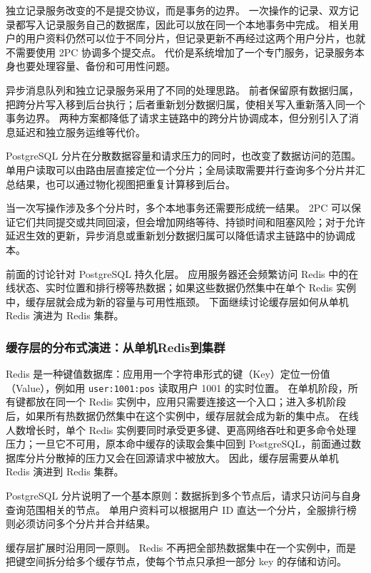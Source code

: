 独立记录服务改变的不是提交协议，而是事务的边界。
一次操作的记录、双方记录都写入记录服务自己的数据库，因此可以放在同一个本地事务中完成。
相关用户的用户资料仍然可以位于不同分片，但记录更新不再经过这两个用户分片，也就不需要使用 2PC 协调多个提交点。
代价是系统增加了一个专门服务，记录服务本身也要处理容量、备份和可用性问题。

异步消息队列和独立记录服务采用了不同的处理思路。
前者保留原有数据归属，把跨分片写入移到后台执行；后者重新划分数据归属，使相关写入重新落入同一个事务边界。
两种方案都降低了请求主链路中的跨分片协调成本，但分别引入了消息延迟和独立服务运维等代价。

PostgreSQL 分片在分散数据容量和请求压力的同时，也改变了数据访问的范围。
单用户读取可以由路由层直接定位一个分片；全局读取需要并行查询多个分片并汇总结果，也可以通过物化视图把重复计算移到后台。

当一次写操作涉及多个分片时，多个本地事务还需要形成统一结果。
2PC 可以保证它们共同提交或共同回滚，但会增加网络等待、持锁时间和阻塞风险；对于允许延迟生效的更新，异步消息或重新划分数据归属可以降低请求主链路中的协调成本。

前面的讨论针对 PostgreSQL 持久化层。
应用服务器还会频繁访问 Redis 中的在线状态、实时位置和排行榜等热数据；如果这些数据仍然集中在单个 Redis 实例中，缓存层就会成为新的容量与可用性瓶颈。
下面继续讨论缓存层如何从单机 Redis 演进为 Redis 集群。

\subsubsection{缓存层的分布式演进：从单机Redis到集群}\label{sec4:redis-cluster-evolution}

Redis 是一种键值数据库：应用用一个字符串形式的键（Key）定位一份值（Value），例如用 \texttt{user:1001:pos} 读取用户 1001 的实时位置。
在单机阶段，所有键都放在同一个 Redis 实例中，应用只需要连接这一个入口；进入多机阶段后，如果所有热数据仍然集中在这个实例中，缓存层就会成为新的集中点。
在线人数增长时，单个 Redis 实例要同时承受更多键、更高网络吞吐和更多命令处理压力；一旦它不可用，原本命中缓存的读取会集中回到 PostgreSQL，前面通过数据库分片分散掉的压力又会在回源请求中被放大。
因此，缓存层需要从单机 Redis 演进到 Redis 集群。

PostgreSQL 分片说明了一个基本原则：数据拆到多个节点后，请求只访问与自身查询范围相关的节点。
单用户资料可以根据用户 ID 直达一个分片，全服排行榜则必须访问多个分片并合并结果。

缓存层扩展时沿用同一原则。
Redis 不再把全部热数据集中在一个实例中，而是把键空间拆分给多个缓存节点，使每个节点只承担一部分 key 的存储和访问。

